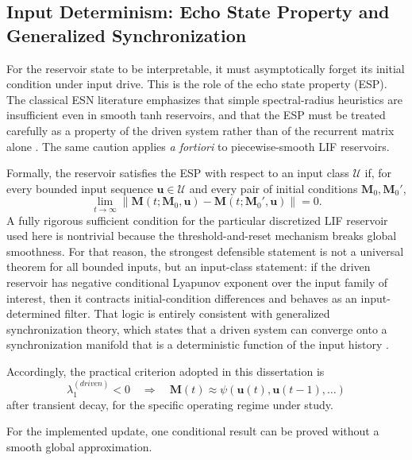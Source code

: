 \subsection{Input Determinism: Echo State Property and Generalized Synchronization}

For the reservoir state to be interpretable, it must asymptotically forget its initial condition under input drive. This is the role of the echo state property (ESP). The classical ESN literature emphasizes that simple spectral-radius heuristics are insufficient even in smooth tanh reservoirs, and that the ESP must be treated carefully as a property of the driven system rather than of the recurrent matrix alone \cite{yildiz_re-visiting_2012}. The same caution applies \emph{a fortiori} to piecewise-smooth LIF reservoirs.

Formally, the reservoir satisfies the ESP with respect to an input class $\mathcal{U}$ if, for every bounded input sequence $\mathbf{u}\in\mathcal{U}$ and every pair of initial conditions $\mathbf{M}_0,\mathbf{M}_0'$,
\begin{equation}
\lim_{t\rightarrow\infty}\left\|\mathbf{M}(t;\mathbf{M}_0,\mathbf{u})-\mathbf{M}(t;\mathbf{M}_0',\mathbf{u})\right\|=0.
\end{equation}
A fully rigorous sufficient condition for the particular discretized LIF reservoir used here is nontrivial because the threshold-and-reset mechanism breaks global smoothness. For that reason, the strongest defensible statement is not a universal theorem for all bounded inputs, but an input-class statement: if the driven reservoir has negative conditional Lyapunov exponent over the input family of interest, then it contracts initial-condition differences and behaves as an input-determined filter. That logic is entirely consistent with generalized synchronization theory, which states that a driven system can converge onto a synchronization manifold that is a deterministic function of the input history \cite{rulkov_generalized_1995,yildiz_re-visiting_2012}.

Accordingly, the practical criterion adopted in this dissertation is
\begin{equation}
\lambda_1^{(driven)} < 0 \quad \Longrightarrow \quad \mathbf{M}(t) \approx \psi(\mathbf{u}(t),\mathbf{u}(t-1),\ldots)
\end{equation}
after transient decay, for the specific operating regime under study.

For the implemented update, one conditional result can be proved without a
smooth global approximation.

